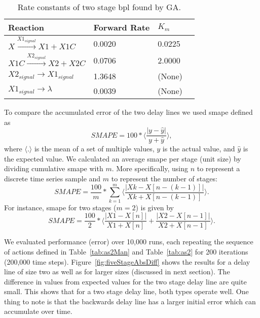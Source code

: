 \begin{table}
    \caption[Two Stage Backwards Propagating Delay Line Rate Constants]{Rate constants of two stage \gls{bpl} found by GA.}
    \label{tab:rateconstants}
    \centering
    \begin{tabular}{llll}
	    Reaction                                 & Forward Rate & $K_m$          \\ \hline
	    $X \xrightarrow{X1_{signal}} X1 + X1C$   & 0.0020       & 0.0225         \\
	    $X1C \xrightarrow{X2_{signal}} X2 + X2C$ & 0.0706       & 2.0000         \\
	    $X2_{signal} \rightarrow X1_{signal}$    & 1.3648       & (None)         \\
	    $X1_{signal} \rightarrow \lambda$        & 0.0039       & (None)         \\
    \end{tabular}
\end{table}

To compare the accumulated error of the two delay lines we used \gls{smape} defined as
\begin{equation}
SMAPE = 100 * \langle \frac{|y-\hat{y}|}{y+\hat{y}} \rangle,
\end{equation}
where $\langle.\rangle$ is the mean of a set of multiple values, $y$ is the actual value, and $\hat{y}$ is the expected value. We calculated an average \gls{smape} per stage (unit size) by dividing cumulative \gls{smape} with $m$. More specifically, using $n$ to represent a discrete time series sample and $m$ to represent the number of stages:
\begin{equation}
SMAPE = \frac{100}{m} * \sum \limits_{k=1}^{m} \langle \frac{|Xk-X[n-(k-1)]|}{Xk+X[n-(k-1)]} \rangle.
\end{equation}
For instance, \gls{smape} for two stages ($m=2$) is given by
\begin{equation}
SMAPE = \frac{100}{2} * \langle \frac{|X1-X[n]|}{X1+X[n]} + \frac{|X2-X[n-1]|}{X2+X[n-1]} \rangle \label{eq:sampn2}.
\end{equation}

We evaluated performance (error) over 10,000 runs, each repeating the sequence of actions defined in Table~\ref{tab:as2Man} and Table~\ref{tab:as2} for 200 iterations (200,000 time steps). Figure~\ref{fig:fiveStageAbsDiff} shows the results for a delay line of size two as well as for larger sizes (discussed in next section). The difference in values from expected values for the two stage delay line are quite small. This shows that for a two stage delay line, both types operate well. One thing to note is that the backwards delay line has a larger initial error which can accumulate over time.

